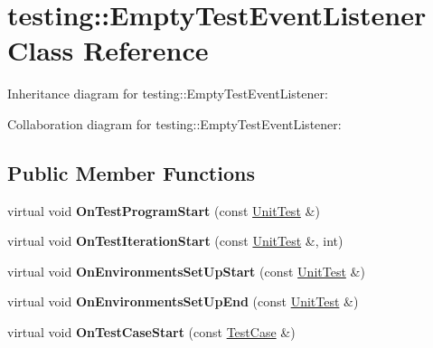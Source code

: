 \hypertarget{classtesting_1_1EmptyTestEventListener}{}\section{testing\+:\+:Empty\+Test\+Event\+Listener Class Reference}
\label{classtesting_1_1EmptyTestEventListener}


Inheritance diagram for testing\+:\+:Empty\+Test\+Event\+Listener\+:


Collaboration diagram for testing\+:\+:Empty\+Test\+Event\+Listener\+:
\subsection*{Public Member Functions}
\begin{DoxyCompactItemize}
\item 
\mbox{\label{classtesting_1_1EmptyTestEventListener_aa3847c8a3c22d8d69a6006dfdd6589fc}} 
virtual void {\bfseries On\+Test\+Program\+Start} (const \hyperlink{classtesting_1_1UnitTest}{Unit\+Test} \&)
\item 
\mbox{\label{classtesting_1_1EmptyTestEventListener_a836f05829855dc60d13ba99ad712c0dd}} 
virtual void {\bfseries On\+Test\+Iteration\+Start} (const \hyperlink{classtesting_1_1UnitTest}{Unit\+Test} \&, int)
\item 
\mbox{\label{classtesting_1_1EmptyTestEventListener_a156d1965248fbdced6aabacadfa2d63f}} 
virtual void {\bfseries On\+Environments\+Set\+Up\+Start} (const \hyperlink{classtesting_1_1UnitTest}{Unit\+Test} \&)
\item 
\mbox{\label{classtesting_1_1EmptyTestEventListener_abc481c6648d15d4242245195a06f5aa0}} 
virtual void {\bfseries On\+Environments\+Set\+Up\+End} (const \hyperlink{classtesting_1_1UnitTest}{Unit\+Test} \&)
\item 
\mbox{\label{classtesting_1_1EmptyTestEventListener_ae4707ed9cc7ace5241bc8ccc4051209b}} 
virtual void {\bfseries On\+Test\+Case\+Start} (const \hyperlink{classtesting_1_1TestCase}{Test\+Case} \&)

\end{DoxyCompactItemize}
